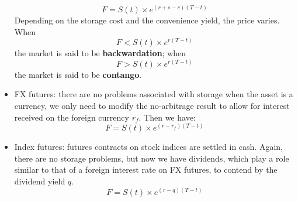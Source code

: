 \begin{itemize}
\begin{equation}
    F = S(t) \times e^{(r+s-c)(T-t)}
\end{equation}
Depending on the storage cost and the convenience yield, the price varies. When 
\begin{equation}
    F < S(t) \times e^{r(T-t)}
\end{equation}
the market is said to be \textbf{backwardation}; when 
\begin{equation}
    F > S(t) \times e^{r(T-t)}
\end{equation}
the market is said to be \textbf{contango}.
    \item FX futures: there are no problems associated with storage when the asset is a currency, we only need to modify the no-arbitrage result to allow for interest received on the foreign currency $r_f$. Then we have:
    \begin{equation}
    F = S(t) \times e^{(r-r_f)(T-t)}
\end{equation}
    \item Index futures: futures contracts on stock indices are settled in cash. Again, there are no storage problems, but now we have dividends, which play a role similar to that of a foreign interest rate on FX futures, to contend by the dividend yield $q$. 
\begin{equation}
    F = S(t) \times e^{(r-q)(T-t)}
\end{equation}
\end{itemize}

